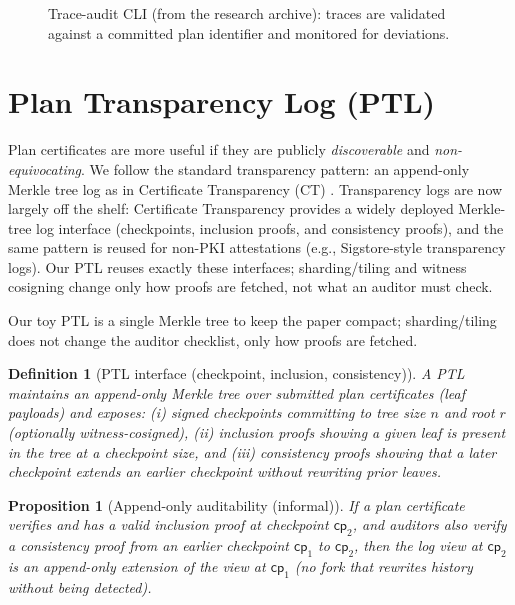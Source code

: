 \documentclass[11pt]{article}
\newtheorem{definition}{Definition}
\newtheorem{proposition}{Proposition}
\begin{document}
\begin{figure}[t]
  \centering
  \caption{Trace-audit CLI (from the research archive): traces are validated against a committed plan identifier and monitored for deviations.}
  \label{fig:cli}
\end{figure}

\section{Plan Transparency Log (PTL)}
Plan certificates are more useful if they are publicly \emph{discoverable} and \emph{non-equivocating}.
We follow the standard transparency pattern: an append-only Merkle tree log as in Certificate Transparency (CT) \cite{rfc6962,rfc9162}.
Transparency logs are now largely off the shelf: Certificate Transparency provides a widely deployed
Merkle-tree log interface (checkpoints, inclusion proofs, and consistency proofs), and the same pattern is reused
for non-PKI attestations (e.g., Sigstore-style transparency logs).
Our PTL reuses exactly these interfaces; sharding/tiling and witness cosigning change only how proofs are fetched,
not what an auditor must check.\cite{rfc6962,rfc9162,rekorDocs}

Our toy PTL is a single Merkle tree to keep the paper compact; sharding/tiling does not change the auditor checklist, only how proofs are fetched.\cite{tileBasedLogsTransparencyDev}

\begin{definition}[PTL interface (checkpoint, inclusion, consistency)]
A PTL maintains an append-only Merkle tree over submitted plan certificates (leaf payloads) and exposes:
(i) \emph{signed checkpoints} committing to tree size $n$ and root $r$ (optionally witness-cosigned),
(ii) \emph{inclusion proofs} showing a given leaf is present in the tree at a checkpoint size, and
(iii) \emph{consistency proofs} showing that a later checkpoint extends an earlier checkpoint without rewriting prior leaves.
\end{definition}

\begin{proposition}[Append-only auditability (informal)]
If a plan certificate verifies and has a valid inclusion proof at checkpoint $\mathsf{cp}_2$, and auditors also verify a consistency proof from an earlier checkpoint $\mathsf{cp}_1$ to $\mathsf{cp}_2$, then the log view at $\mathsf{cp}_2$ is an append-only extension of the view at $\mathsf{cp}_1$ (no fork that rewrites history without being detected).
\end{proposition}
\end{document}
